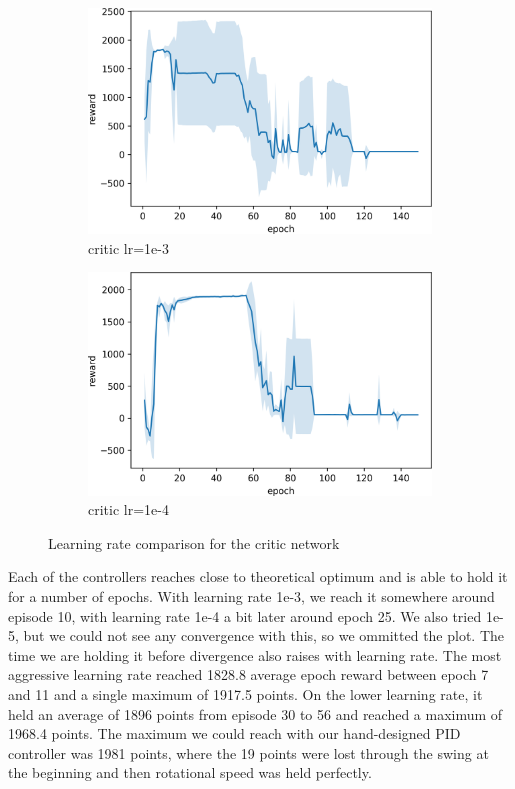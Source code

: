 \documentclass[hyperref,beleg]{cgvpub}
\begin{document}
\begin{figure}
\centering
\begin{subfigure}{.5\textwidth}
  \centering
  \includegraphics[width=.8\linewidth]{images/plot_critic_1e-3.png}
  \caption{critic lr=1e-3}
\end{subfigure}%
\begin{subfigure}{.5\textwidth}
  \centering
  \includegraphics[width=.8\linewidth]{images/plot_critic_1e-4.png}
  \caption{critic lr=1e-4}
\end{subfigure}
\caption{Learning rate comparison for the critic network}
\label{fig:critic_lr}
\end{figure}

Each of the controllers reaches close to theoretical optimum and is able to hold it for a number of epochs. With learning rate 1e-3, we reach it somewhere around episode 10, with learning rate 1e-4 a bit later around epoch 25. We also tried 1e-5, but we could not see any convergence with this, so we ommitted the plot. The time we are holding it before divergence also raises with learning rate. The most aggressive learning rate reached 1828.8 average epoch reward between epoch 7 and 11 and a single maximum of 1917.5 points. On the lower learning rate, it held an average of 1896 points from episode 30 to 56 and reached a maximum of 1968.4 points. The maximum we could reach with our hand-designed PID controller was 1981 points, where the 19 points were lost through the swing at the beginning and then rotational speed was held perfectly.
\end{document}
